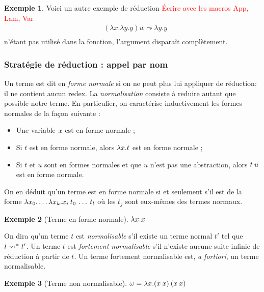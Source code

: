 \documentclass {article}
\theoremstyle{definition}
\newtheorem{example}{Exemple}
\theoremstyle{remark}
\newcommand{\todo}[1]{\textcolor{red}{#1}}
\begin{document}
\begin{example}
  Voici un autre exemple de réduction
  \todo{Écrire avec les macros App, Lam, Var}
  \begin{align*}
    & (\lambda x .\lambda y. y) w \leadsto \lambda y.y \\
  \end{align*}
   n'étant pas utilisé dans la fonction, l'argument  disparaît complètement.
\end{example}


\subsubsection{Stratégie de réduction : appel par nom}

\label{reduction:call_by_name}
Un terme est dit en \emph{forme
  normale} si on ne peut plus lui
appliquer de réduction: il ne contient aucun redex. La \emph{normalisation}
consiste à reduire autant que possible notre terme. En
particulier, on caractérise inductivement les formes normales de la
façon suivante :
%
\begin{itemize}
\item Une variable \(x\) est en forme normale ;
\item Si \(t\) est en forme normale, alors \(\lambda x. t\) est en
  forme normale ;
\item Si \(t\) et \(u\) sont en formes normales et que \(u\) n'est pas
  une abstraction, alors \(t\:u\) est en forme normale.
\end{itemize}

On en déduit qu'un terme est en forme normale si et seulement s'il est
de la forme
\(\lambda x_0. \ldots\lambda x_k. x_i\:t_0\:\ldots\:t_l\)
où les \(t_j\) sont eux-mêmes des termes normaux.

\begin{example}[Terme en forme normale]
  \todo{\(\lambda x. x\)}
\end{example}

On dira qu'un terme \(t\) est \emph{normalisable} s'il existe un terme
normal \(t'\) tel que \(t \leadsto^{*} t'\). Un terme \(t\) est
\emph{fortement normalisable} s'il n'existe aucune suite infinie de
réduction à partir de \(t\). Un terme fortement normalisable est,
\textit{a fortiori}, un terme normalisable.

\begin{example}[Terme non normalisable]
  \todo{\(\omega = \lambda x. (x\:x)\:(x\:x)\)}
\end{example}
\end{document}
